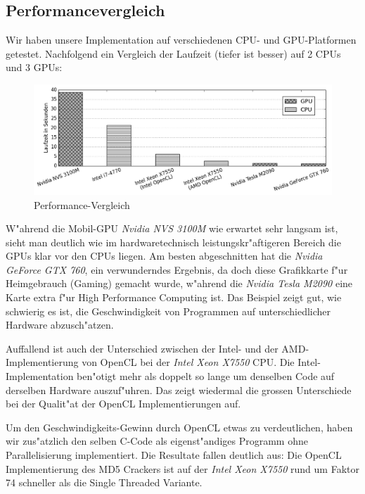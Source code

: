 \begin{refsection}
\newpage
\subsection{Performancevergleich}

Wir haben unsere Implementation auf verschiedenen CPU- und GPU-Platformen
getestet. Nachfolgend ein Vergleich der Laufzeit (tiefer ist besser) auf 2 CPUs
und 3 GPUs:

\begin{figure}[H]
	\centering
	\includegraphics[width=.9\textwidth]{crypto/graphs/speed_comparison_v1.png}
	\caption{Performance-Vergleich}
	\label{img:crypto:speed_comparison_v1}
\end{figure}

W"ahrend die Mobil-GPU \textit{Nvidia NVS 3100M} wie erwartet sehr
langsam ist, sieht man deutlich wie im hardwaretechnisch leistungskr"aftigeren
Bereich die GPUs klar vor den CPUs liegen. Am besten abgeschnitten hat die
\textit{Nvidia GeForce GTX 760}, ein verwunderndes Ergebnis, da doch diese
Grafikkarte f"ur Heimgebrauch (Gaming) gemacht wurde, w"ahrend die
\textit{Nvidia Tesla M2090} eine Karte extra f"ur High Performance Computing
ist. Das Beispiel zeigt gut, wie schwierig es ist, die Geschwindigkeit von
Programmen auf unterschiedlicher Hardware abzusch"atzen.

Auffallend ist auch der Unterschied zwischen der Intel- und der
AMD-Implementierung von OpenCL bei der \textit{Intel Xeon X7550} CPU. Die
Intel-Implementation ben"otigt mehr als doppelt so lange um denselben Code auf
derselben Hardware auszuf"uhren. Das zeigt wiedermal die grossen Unterschiede
bei der Qualit"at der OpenCL Implementierungen auf.

Um den Geschwindigkeits-Gewinn durch OpenCL etwas zu verdeutlichen, haben wir
zus"atzlich den selben C-Code als eigenst"andiges Programm ohne Parallelisierung
implementiert. Die Resultate fallen deutlich aus: Die OpenCL Implementierung des
MD5 Crackers ist auf der \textit{Intel Xeon X7550} rund um Faktor 74 schneller
als die Single Threaded Variante.


\end{refsection}
